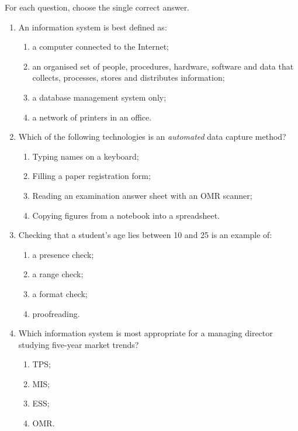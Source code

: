 \documentclass[11pt]{article}
\begin{document}
\begin{exercice}
For each question, choose the single correct answer.
\begin{enumerate}
\item An information system is best defined as:
\begin{enumerate}
\item a computer connected to the Internet;
\item an organised set of people, procedures, hardware, software and data that collects, processes, stores and distributes information;
\item a database management system only;
\item a network of printers in an office.
\end{enumerate}
\item Which of the following technologies is an \emph{automated} data capture method?
\begin{enumerate}
\item Typing names on a keyboard;
\item Filling a paper registration form;
\item Reading an examination answer sheet with an OMR scanner;
\item Copying figures from a notebook into a spreadsheet.
\end{enumerate}
\item Checking that a student's age lies between 10 and 25 is an example of:
\begin{enumerate}
\item a presence check;
\item a range check;
\item a format check;
\item proofreading.
\end{enumerate}
\item Which information system is most appropriate for a managing director studying five-year market trends?
\begin{enumerate}
\item TPS;
\item MIS;
\item ESS;
\item OMR.
\end{enumerate}
\end{enumerate}
\end{exercice}
\end{document}
